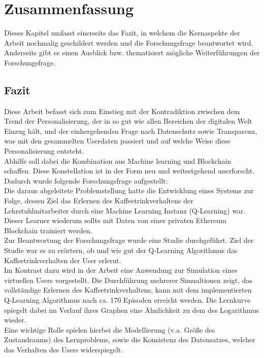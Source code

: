 \chapter{Zusammenfassung}
\label{kap:Kapitel05}
Dieses Kapitel umfasst einerseits das Fazit, in welchem die Kernaspekte der Arbeit nochmalig geschildert werden und die Forschungsfrage beantwortet wird. Anderseits gibt es einen Ausblick bzw. thematisiert mögliche Weiterführungen der Forschungsfrage. 

\section{Fazit}
\label{sec:fazit}
Diese Arbeit befasst sich zum Einstieg mit der Kontradiktion zwischen dem Trend der Personalisierung, der in so gut wie allen Bereichen der digitalen Welt Einzug hält, und der einhergehenden Frage nach Datenschutz sowie Transparenz, was mit den gesammelten Userdaten passiert und auf welche Weise diese Personalisierung entsteht.\\
Abhilfe soll dabei die Kombination aus Machine learning und Blockchain schaffen. Diese Konstellation ist in der Form neu und weitestgehend unerforscht. Dadurch wurde folgende Forschungsfrage aufgestellt: \\ 
Die daraus abgeleitete Problemstellung hatte die Entwicklung eines Systems zur Folge, dessen Ziel das Erlernen des Kaffeetrinkverhaltens der Lehrstuhlmitarbeiter durch eine Machine Learning Instanz (Q-Learning) war. Dieser Learner wiederum sollte mit Daten von einer privaten Ethereum Blockchain trainiert werden. \\
Zur Beantwortung der Forschungsfrage wurde eine Studie durchgeführt.
Ziel der Studie war es zu erörtern, ob und wie gut der Q-Learning Algorithmus das Kaffeetrinkverhalten der User erlernt. \\
Im Kontrast dazu wird in der Arbeit eine Anwendung zur Simulation eines virtuellen Users vorgestellt. Die Durchführung mehrerer Simualtionen zeigt, das vollständige Erlernen des Kaffeetrinkverhaltens, kann mit dem implementierten Q-Learning Algorithmus nach ca. 170 Episoden erreicht werden. 
Die Lernkurve spiegelt dabei im Verlauf ihres Graphen eine Ähnlichkeit zu dem des Logarithmus wieder. \\
Eine wichtige Rolle spielen hierbei die Modellierung (v.a. Größe des Zustandraums) des Lernproblems, sowie die Konsistenz des Datensatzes, welcher das Verhalten des Users widerspiegelt. \\
